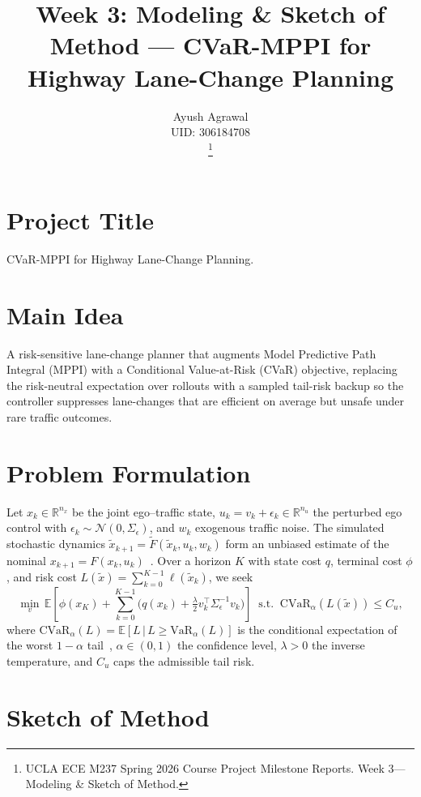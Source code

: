 \documentclass[letterpaper, 10 pt, conference]{ieeeconf}  %
\title{\LARGE \bf
Week 3: Modeling \& Sketch of Method --- CVaR-MPPI for Highway Lane-Change Planning}
\author{ \parbox{4 in}{\centering Ayush Agrawal\\ UID: 306184708}
\thanks{UCLA ECE M237 Spring 2026 Course Project Milestone Reports. Week 3---Modeling \& Sketch of Method.}
}
\begin{document}
\maketitle

\section{Project Title}
\noindent CVaR-MPPI for Highway Lane-Change Planning.

\section{Main Idea}
A risk-sensitive lane-change planner that augments Model Predictive Path Integral (MPPI) with a Conditional Value-at-Risk (CVaR) objective, replacing the risk-neutral expectation over rollouts with a sampled tail-risk backup so the controller suppresses lane-changes that are efficient on average but unsafe under rare traffic outcomes.

\section{Problem Formulation}
Let $x_k\!\in\!\mathbb{R}^{n_x}$ be the joint ego--traffic state, $u_k\!=\!v_k\!+\!\epsilon_k\!\in\!\mathbb{R}^{n_u}$ the perturbed ego control with $\epsilon_k\!\sim\!\mathcal{N}(0,\Sigma_\epsilon)$, and $w_k$ exogenous traffic noise. The simulated stochastic dynamics $\tilde{x}_{k+1}\!=\!\tilde{F}(\tilde{x}_k,u_k,w_k)$ form an unbiased estimate of the nominal $x_{k+1}\!=\!F(x_k,u_k)$~\cite{ramppi}. Over a horizon $K$ with state cost $q$, terminal cost $\phi$, and risk cost $L(\tilde{x})\!=\!\sum_{k=0}^{K-1}\ell(\tilde{x}_k)$, we seek
\begin{equation}\label{eq:obj}
\min_{v}\,\mathbb{E}\!\left[\phi(x_K)\!+\!\sum_{k=0}^{K-1}\!\Big(q(x_k)\!+\!\tfrac{\lambda}{2}v_k^{\!\top}\Sigma_\epsilon^{-1}v_k\Big)\right]\;\;\text{s.t.}\;\;\mathrm{CVaR}_\alpha\!(L(\tilde{x}))\!\le\!C_u,
\end{equation}
where $\mathrm{CVaR}_\alpha(L)\!=\!\mathbb{E}[L\,|\,L\!\ge\!\mathrm{VaR}_\alpha(L)]$ is the conditional expectation of the worst $1\!-\!\alpha$ tail~\cite{rockafellar}, $\alpha\!\in\!(0,1)$ the confidence level, $\lambda\!>\!0$ the inverse temperature, and $C_u$ caps the admissible tail risk.

\section{Sketch of Method}
\end{document}
